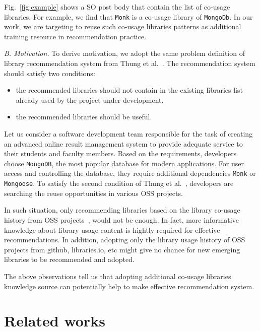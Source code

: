 \documentclass[paper]{ieice}
\begin{document}
Fig.~\ref{fig:example} shows a SO post body that contain the list of co-usage libraries. For example, we find that \texttt{Monk} is a co-usage library of \texttt{MongoDb}. In our work, we are targeting to reuse such co-usage libraries patterns as additional training resource in recommendation practice.

\noindent\textit{B. Motivation. } To derive motivation, we adopt the same problem definition of library recommendation system from Thung et al.~\cite{thung2013automated}. The recommendation system should satisfy two conditions:
\begin{itemize}
    \item the recommended libraries should not contain in the existing libraries list already used by the project under development.
    \item the recommended libraries should be useful.
\end{itemize}
Let us consider a software development team responsible for the task of creating an advanced online result management system to provide adequate service to their students and faculty members. Based on the requirements, developers choose \texttt{MongoDB}, the most popular database for modern applications. For user access and controlling the database, they require additional dependencies \texttt{Monk} or \texttt{Mongoose}. To satisfy the second condition of Thung et al.~\cite{thung2013automated}, developers are searching the reuse opportunities in various OSS projects. 

In such situation, only recommending libraries based on the library co-usage history from OSS projects~\cite{thung2013automated, nguyen2020crossrec}, would not be enough. In fact, more informative knowledge about library usage content is hightly required for effective recommendations. In addition, adopting only the library usage history of OSS projects from github, libraries.io, etc might give no chance for new emerging libraries to be recommended and adopted.

The above observations tell us that adopting additional co-usage libraries knowledge source can potentially help to make effective recommendation system. \\

\section{Related works}
\label{sec:background}

\end{document}
